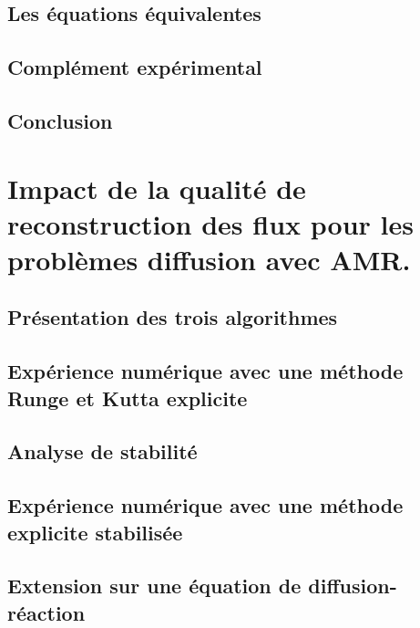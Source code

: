 \documentclass[11pt]{report}
\theoremstyle{definition}
\theoremstyle{remark}
\begin{document}
        \subsection{Les équations équivalentes}  
        \newpage
        \subsection{Complément expérimental}            
        \subsection{Conclusion}                         
    
    \newpage
    \section{Impact de la qualité de reconstruction des flux pour les problèmes diffusion avec AMR.}
        
        \subsection{Présentation des trois algorithmes}     
        \subsection{Expérience numérique avec une méthode Runge et Kutta explicite}     
        \newpage
        \subsection{Analyse de stabilité}       
        \newpage
        \subsection{Expérience numérique avec une méthode explicite stabilisée}      
        \newpage
        \subsection{Extension sur une équation de diffusion-réaction}      
\end{document}
